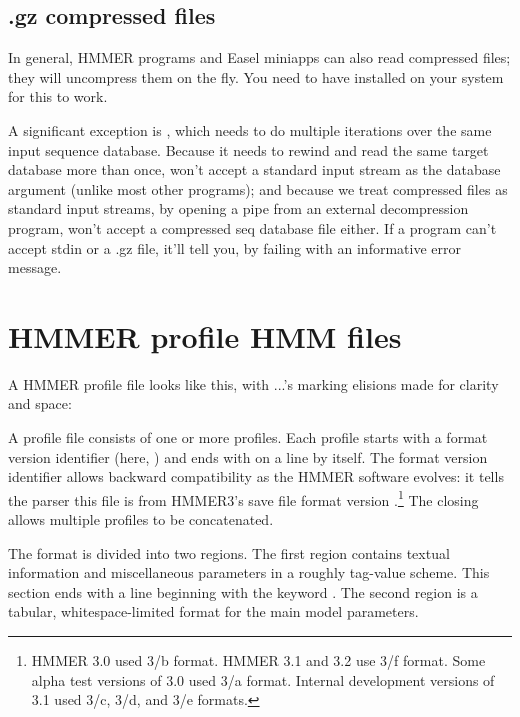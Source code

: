 \subsection{.gz compressed files}

In general, HMMER programs and Easel miniapps can also read 
compressed files; they will uncompress them on the fly. You need to
have  installed on your system for this to work.

A significant exception is , which needs to do
multiple iterations over the same input sequence database. Because it
needs to rewind and read the same target database more than once,
 won't accept a standard input stream as the database
argument (unlike most other programs); and because we treat compressed
files as standard input streams, by opening a pipe from an external
decompression program,  won't accept a compressed seq
database file either. If a program can't accept stdin or a .gz file,
it'll tell you, by failing with an informative error message.



\newpage
\section{HMMER profile HMM files}
\label{section:savefiles}

A HMMER profile file looks like this, with ...'s marking elisions made
for clarity and space:


A profile file consists of one or more profiles.  Each profile starts
with a format version identifier (here, ) and ends with
\mono{//} on a line by itself.  The format version identifier allows
backward compatibility as the HMMER software evolves: it tells the
parser this file is from HMMER3's save file format version
\HMMERfmtversion{}.\footnote{HMMER 3.0 used 3/b format. HMMER 3.1 and 3.2 use 3/f
  format.  Some alpha test versions of 3.0 used 3/a format. Internal
  development versions of 3.1 used 3/c, 3/d, and 3/e formats.}  The
closing \mono{//} allows multiple profiles to be concatenated.

The format is divided into two regions. The first region contains
textual information and miscellaneous parameters in a roughly
tag-value scheme.  This section ends with a line beginning with the
keyword . The second region is a tabular, whitespace-limited
format for the main model parameters.

